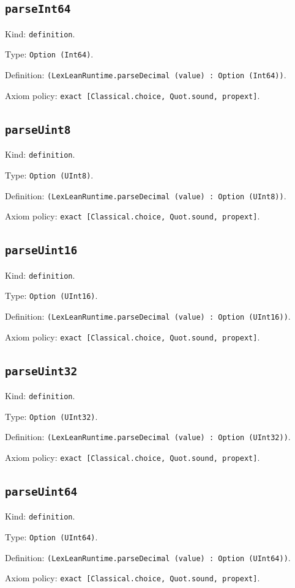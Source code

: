 \documentclass[11pt]{article}
\begin{document}
\subsection*{\texttt{parseInt64}}
\noindent Kind: \texttt{definition}.\par
\noindent Type: \texttt{Option (Int64)}.\par
\noindent Definition: \texttt{(LexLeanRuntime.parseDecimal (value) : Option (Int64))}.\par
\noindent Axiom policy: \texttt{exact [Classical.choice, Quot.sound, propext]}.\par
\subsection*{\texttt{parseUint8}}
\noindent Kind: \texttt{definition}.\par
\noindent Type: \texttt{Option (UInt8)}.\par
\noindent Definition: \texttt{(LexLeanRuntime.parseDecimal (value) : Option (UInt8))}.\par
\noindent Axiom policy: \texttt{exact [Classical.choice, Quot.sound, propext]}.\par
\subsection*{\texttt{parseUint16}}
\noindent Kind: \texttt{definition}.\par
\noindent Type: \texttt{Option (UInt16)}.\par
\noindent Definition: \texttt{(LexLeanRuntime.parseDecimal (value) : Option (UInt16))}.\par
\noindent Axiom policy: \texttt{exact [Classical.choice, Quot.sound, propext]}.\par
\subsection*{\texttt{parseUint32}}
\noindent Kind: \texttt{definition}.\par
\noindent Type: \texttt{Option (UInt32)}.\par
\noindent Definition: \texttt{(LexLeanRuntime.parseDecimal (value) : Option (UInt32))}.\par
\noindent Axiom policy: \texttt{exact [Classical.choice, Quot.sound, propext]}.\par
\subsection*{\texttt{parseUint64}}
\noindent Kind: \texttt{definition}.\par
\noindent Type: \texttt{Option (UInt64)}.\par
\noindent Definition: \texttt{(LexLeanRuntime.parseDecimal (value) : Option (UInt64))}.\par
\noindent Axiom policy: \texttt{exact [Classical.choice, Quot.sound, propext]}.\par
\end{document}
